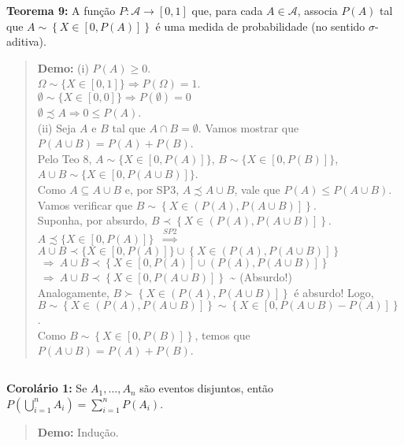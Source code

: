 \documentclass[
]{book}
\begin{document}
\(~\)

\textbf{Teorema 9:} A função \(P: \mathcal{A} \longrightarrow [0,1]\) que, para cada \(A \in \mathcal{A}\), associa \(P(A)\) tal que \(A \sim \left\{X \in \left[0,P(A)\right]\right\}\) é uma medida de probabilidade (no sentido \(\sigma\)-aditiva).

\begin{quote}
\textbf{Demo:}
(i) \(P(A) \geq 0\).\\
\(\Omega \sim \{X \in [0,1]\}\Rightarrow P(\Omega)=1\).\\
\(\emptyset \sim \{X \in [0,0]\} \Rightarrow P(\emptyset)=0\)\\
\(\emptyset \precsim A \Rightarrow 0 \leq P(A)\).\\
\(~\)\\
(ii) Seja \(A\) e \(B\) tal que \(A \cap B = \emptyset\). Vamos mostrar que \(P(A \cup B) = P(A) + P(B)\).\\
Pelo Teo 8, \(A \sim \{ X \in [0,P(A)]\}\), \(B \sim \{ X \in [0,P(B)]\}\), \(A \cup B \sim \{ X \in [0,P(A \cup B)]\}\).\\
Como \(A \subseteq A \cup B\) e, por SP3, \(A \precsim A \cup B\), vale que \(P(A) \leq P(A \cup B)\). Vamos verificar que \(B \sim \left\{X \in \left(P(A),P(A \cup B) \right]\right\}\).\\
Suponha, por absurdo, \(B \prec \left\{X \in \left(P(A),P(A \cup B) \right]\right\}\).\\
\(A \precsim \{X \in [0,P(A)]\}\) \(~\overset{SP2}{\Longrightarrow}~\)
\(A \cup B \prec \{X \in [0,P(A)]\} \cup \left\{X \in \left(P(A),P(A \cup B) \right]\right\}\)
\(~\Rightarrow~ A \cup B \prec \left\{X \in [0,P(A)] \cup \left(P(A),P(A \cup B) \right]\right\}\)
\(~\Rightarrow~ A \cup B \prec \left\{X \in \left[0,P(A \cup B) \right]\right\}\) \textasciitilde{} (Absurdo!)\\
Analogamente, \(B \succ \left\{X \in \left(P(A),P(A \cup B) \right]\right\}\) é absurdo! Logo, \(B \sim \left\{X \in \left(P(A),P(A \cup B) \right]\right\} \sim \left\{X \in \left[0, P(A \cup B)-P(A) \right]\right\}\).\\
Como \(B \sim \left\{X \in \left[0,P(B)\right]\right\}\), temos que \(P(A \cup B) = P(A) + P(B)\).
\end{quote}

\(~\)

\textbf{Corolário 1:} Se \(A_1, \ldots, A_n\) são eventos disjuntos, então \(P\left(\bigcup_{i=1}^{n} A_i\right) = \sum_{i=1}^{n} P\left(A_i\right)\).

\begin{quote}
\textbf{Demo:} Indução.
\end{quote}
\end{document}
